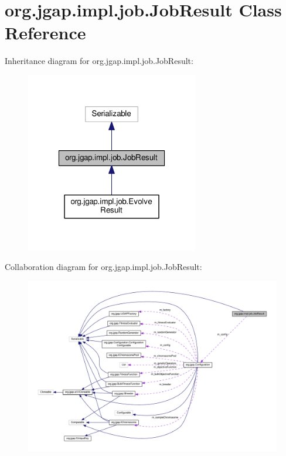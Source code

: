 \hypertarget{classorg_1_1jgap_1_1impl_1_1job_1_1_job_result}{\section{org.\-jgap.\-impl.\-job.\-Job\-Result Class Reference}
\label{classorg_1_1jgap_1_1impl_1_1job_1_1_job_result}
}


Inheritance diagram for org.\-jgap.\-impl.\-job.\-Job\-Result\-:
\nopagebreak
\begin{figure}[H]
\begin{center}
\leavevmode
\includegraphics[width=214pt]{classorg_1_1jgap_1_1impl_1_1job_1_1_job_result__inherit__graph}
\end{center}
\end{figure}


Collaboration diagram for org.\-jgap.\-impl.\-job.\-Job\-Result\-:
\nopagebreak
\begin{figure}[H]
\begin{center}
\leavevmode
\includegraphics[width=350pt]{classorg_1_1jgap_1_1impl_1_1job_1_1_job_result__coll__graph}
\end{center}
\end{figure}
